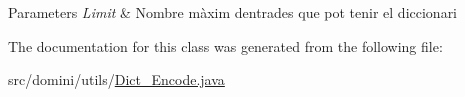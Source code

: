 \begin{DoxyParams}{Parameters}
{\em Limit} & Nombre màxim d\textquotesingle{}entrades que pot tenir el diccionari \\
\hline
\end{DoxyParams}


The documentation for this class was generated from the following file\+:\begin{DoxyCompactItemize}
\item 
src/domini/utils/\hyperlink{Dict__Encode_8java}{Dict\+\_\+\+Encode.\+java}\end{DoxyCompactItemize}
